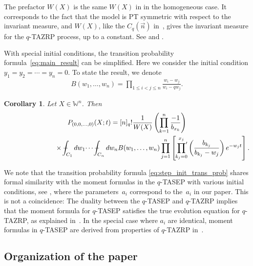 \documentclass[pdftex]{sigma}
\numberwithin{equation}{section}
\newtheorem{Corollary}[Theorem]{Corollary}
\def\Xint#1{\mathchoice
{\XXint\displaystyle\textstyle{#1}}%
{\XXint\textstyle\scriptstyle{#1}}%
{\XXint\scriptstyle\scriptscriptstyle{#1}}%
{\XXint\scriptscriptstyle\scriptscriptstyle{#1}}%
\!\int}
\def\XXint#1#2#3{{\setbox0=\hbox{$#1{#2#3}{\int}$}
\vcenter{\hbox{$#2#3$}}\kern-.5\wd0}}
\def\dashint{\Xint-}
\newcommand{\prodprime}{\sideset{}{'}\prod}
\newcommand{\Weylchamber}{\mathbb{W}}
\begin{document}
\begin{Remark}
 The prefactor $W(X)$ is the same $W(X)$ in \cite[Theorem~2.1]{Korhonen-Lee14} in the homogeneous case. It corresponds to the fact that the model is PT symmetric with respect to the invariant measure, and $W(X)$, like the $C_q(\vec{n})$ in~\cite{Borodin-Corwin-Petrov-Sasamoto15}, gives the invariant measure for the $q$-TAZRP process, up to a constant. See \cite[Remark~2.3]{Borodin-Corwin-Petrov-Sasamoto15} and \cite[Corollary~3.3.12]{Borodin-Corwin13}.
\end{Remark}
With special initial conditions, the transition probability formula~\eqref{eq:main_result} can be simplif\/ied. Here we consider the initial condition $y_1 = y_2 = \dotsb = y_n = 0$. To state the result, we denote
\begin{gather}
 B(w_1, \dotsc, w_n) = \prod_{1 \leq i < j \leq n} \frac{w_i - w_j}{w_i - q w_j}.
\end{gather}
\begin{Corollary} \label{cor:step_init}
 Let $X \in \Weylchamber^n$. Then
 \begin{gather}
 P_{(0, 0, \dotsc, 0)}(X; t) = [n]_q! \frac{1}{W(X)} \left( \prod^n_{k = 1} \frac{-1}{b_{x_k}} \right) \nonumber\\
 \hphantom{P_{(0, 0, \dotsc, 0)}(X; t) =}{}
 \times \dashint_{C_1} dw_1 \dotsi \dashint_{C_n} dw_n B(w_1, \dotsc, w_n) \prod^n_{j = 1} \left[ \prodprime^{x_j}_{k_j = 0} \left( \frac{b_{k_j}}{b_{k_j} - w_j} \right) e^{-w_j t} \right].\label{eq:step_init_trans_prob}
 \end{gather}
\end{Corollary}

We note that the transition probability formula \eqref{eq:step_init_trans_prob} shares formal similarity with the moment formulas in the $q$-TASEP with various initial conditions, see \cite[Theorem~2.11 and Corollary~2.12]{Borodin-Corwin-Sasamoto14}, where the parameters~$a_i$ correspond to the~$a_i$ in our paper. This is not a coincidence: The duality between the $q$-TASEP and $q$-TAZRP implies that the moment formula for $q$-TASEP satisf\/ies the true evolution equation for $q$-TAZRP, as explained in~\cite{Borodin-Corwin-Sasamoto14}. In the special case where $a_i$ are identical, moment formulas in $q$-TASEP are derived from properties of $q$-TAZRP in~\cite{Borodin-Corwin-Petrov-Sasamoto15}.

\subsection*{Organization of the paper}
\end{document}
